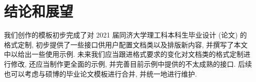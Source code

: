 
\section{结论和展望}

我们创作的模板初步完成了对 2021 届同济大学理工科本科生毕业设计 (论文) 的格式定制, 初步提供了一些接口供用户配置文档类以及排版新内容, 并撰写了本文中以给出一些使用示例. 未来我们应当跟进格式要求的变化对文档类的格式定制进行修改, 还应当制作更全面的示例, 并完善目前示例中提供的不太成熟的接口. 后续也可以考虑与硕博的毕业论文模板进行合并, 并统一地进行维护.\cite{atiyah_introduction_1969}
